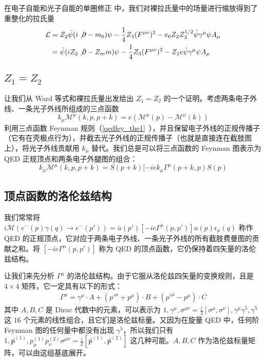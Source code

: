 

在电子自能和光子自能的单圈修正 中，我们对裸拉氏量中的场量进行缩放得到了重整化的拉氏量
\begin{equation}
\begin{aligned}
\mathcal{L} &= Z_2\bar\psi (i\not\partial - m_0)\psi - \frac{1}{4}Z_3 (F^{\mu\nu})^2-e_0Z_2Z_3^{1/2} \bar\psi \gamma^\mu\psi A_\mu\\
&=\bar\psi (iZ_2\not\partial - Z_m m)\psi - \frac{1}{4}Z_3 (F^{\mu\nu})^2-Z_1 e \bar\psi \gamma^\mu\psi A_\mu
\end{aligned}
\end{equation}

\subsection{$Z_1=Z_2$}
让我们从 Ward 等式和裸拉氏量出发给出 $Z_1=Z_2$ 的一个证明。考虑两条电子外线、一条光子外线所组成的三点函数
\begin{equation}
k_\mu \mathcal{M}^\mu(k,p,p+k)=e(\mathcal{M}^{\mu}(p)- \mathcal{M}^{\mu}(k))
\end{equation}
利用三点函数 Feynman 规则（\autoref{qedfey_the1}~），并且保留电子外线的正规传播子（它有在壳极点行为），并截去光子外线的正规传播子（也就是直接连在截肢图上），将光子外线贡献用 $k_\mu$ 替代。我们总是可以将三点函数的 Feynman 图表示为 QED 正规顶点和两条电子外腿图的组合：
\begin{equation}
k_\mu \mathcal{M}^\mu(k,p,p+k) = S(p+k) [-iek_\mu \Gamma^\mu(p+k,p) S(p) 
\end{equation}



\subsection{顶点函数的洛伦兹结构}
我们常常将 $i\mathcal{M}(e^-(p)\gamma(q)\rightarrow e^-(p'))=\bar u(p') [-ie\Gamma^\mu(p,p')]u(p) \epsilon_\mu(q)$ 称作 QED 的正规顶点，它对应于两条电子外线、一条光子外线的所有截肢费曼图的贡献之和。将 $[-ie\Gamma^\mu(p,p')]$ 称为 QED 的顶点函数，它仍保持着四矢量的洛伦兹结构。

让我们来先分析 $\Gamma^\mu$ 的洛伦兹结构。由于它服从洛伦兹四矢量的变换规则，且是 $4\times 4$ 矩阵，它一定具有以下的形式：
\begin{equation}
\begin{aligned}
\Gamma^\mu=\gamma^\mu\cdot A + ({p'}^\mu + p^\mu)\cdot B + ({p'}^\mu - p^\mu) \cdot C
\end{aligned}
\end{equation}
其中 $A,B,C$ 是 Dirac 代数中的元素，可以表示为 $1,\gamma^\mu,\sigma^{\mu\nu}=\frac{i}{2}[\sigma^\mu,\sigma^\nu],\gamma^\mu\gamma^5,\gamma^5$ 这 $16$ 个元素的线性组合，且它们是洛伦兹标量。又因为在旋量 QED 中，任何阶 Feynman 图的任何量中都没有出现 $\gamma^5$，所以我们只有 $1,\not p^{(1)},p_\mu^{(1)} p_\nu^{(2)} \sigma^{\mu\nu}=\frac{i}{2}[\not p^{(1)},\not p^{(2)}]$ 这几种可能。$A,B,C$ 作为洛伦兹标量矩阵，可以由这组基底展开。

